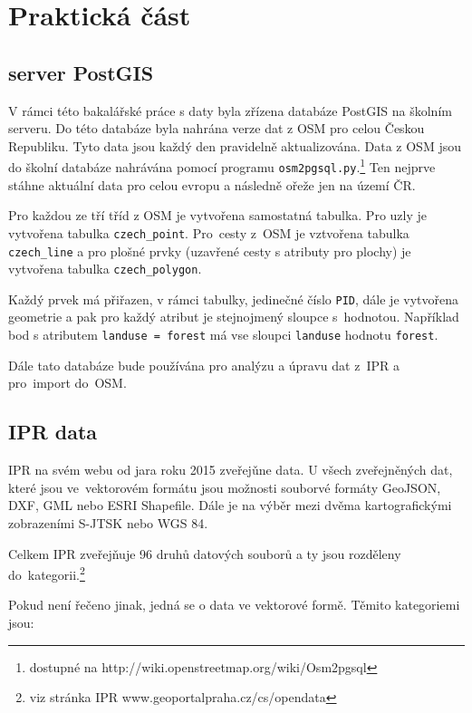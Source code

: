 \chapter{Praktická část}
\label{3-Praktická část}

\section{server PostGIS}
\label{server PostGIS}
V rámci této bakalářské práce s daty byla zřízena databáze PostGIS na školním
serveru. Do této databáze byla nahrána verze dat z OSM pro celou Českou
Republiku. Tyto data jsou každý den pravidelně aktualizována.
Data z OSM jsou do školní databáze nahrávána pomocí programu {\tt osm2pgsql.py}.\footnote{dostupné na http://wiki.openstreetmap.org/wiki/Osm2pgsql}
Ten nejprve stáhne aktuální data pro celou evropu a následně ořeže
jen na území ČR. 

Pro každou ze tří tříd z OSM je vytvořena samostatná 
tabulka. Pro uzly je vytvořena tabulka {\tt czech\_point}.
Pro~cesty z~OSM je vztvořena tabulka {\tt czech\_line} a pro plošné 
prvky (uzavřené cesty s atributy pro plochy) je vytvořena tabulka
{\tt czech\_polygon}.

Každý prvek má přiřazen, v rámci tabulky, jedinečné číslo {\tt PID}, 
dále je vytvořena geometrie a pak pro každý atribut je stejnojmený 
sloupce s~hodnotou. 
Například bod s atributem {\tt landuse = forest} má vse sloupci 
{\tt landuse} hodnotu {\tt forest}.

Dále tato databáze bude používána pro analýzu a úpravu dat z~IPR a
pro~import do~OSM.


\section{IPR data}
\label{IPR data}
IPR na svém webu od jara roku 2015 zveřejǔne data.
U všech zveřejněných dat, které jsou ve~vektorovém formátu jsou
možnosti souborvé formáty GeoJSON, DXF, GML nebo ESRI Shapefile.
Dále je na výběr mezi dvěma kartografickými zobrazeními S-JTSK nebo WGS 84.

Celkem IPR zveřejňuje 96 druhů datových souborů a ty jsou rozděleny
do~kategorii.\footnote{viz stránka IPR www.geoportalpraha.cz/cs/opendata}

Pokud není řečeno jinak, jedná se o data ve vektorové formě.
Těmito kategoriemi jsou:

